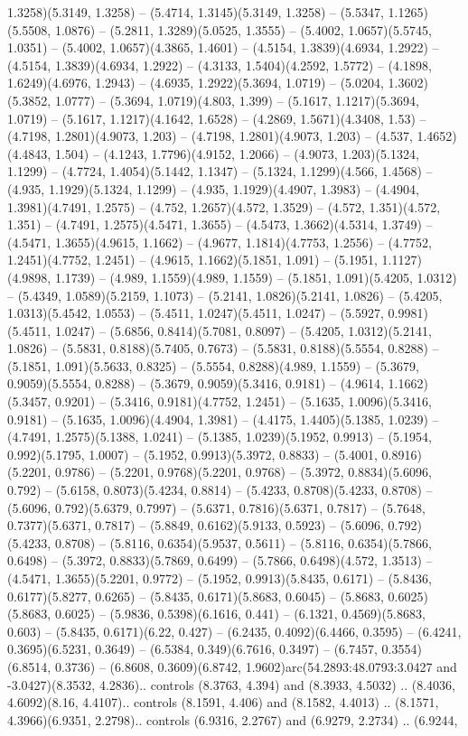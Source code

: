 1.3258)(5.3149, 1.3258) -- (5.4714, 1.3145)(5.3149, 1.3258) -- (5.5347, 1.1265)(5.5508, 1.0876) -- (5.2811, 1.3289)(5.0525, 1.3555) -- (5.4002, 1.0657)(5.5745, 1.0351) -- (5.4002, 1.0657)(4.3865, 1.4601) -- (4.5154, 1.3839)(4.6934, 1.2922) -- (4.5154, 1.3839)(4.6934, 1.2922) -- (4.3133, 1.5404)(4.2592, 1.5772) -- (4.1898, 1.6249)(4.6976, 1.2943) -- (4.6935, 1.2922)(5.3694, 1.0719) -- (5.0204, 1.3602)(5.3852, 1.0777) -- (5.3694, 1.0719)(4.803, 1.399) -- (5.1617, 1.1217)(5.3694, 1.0719) -- (5.1617, 1.1217)(4.1642, 1.6528) -- (4.2869, 1.5671)(4.3408, 1.53) -- (4.7198, 1.2801)(4.9073, 1.203) -- (4.7198, 1.2801)(4.9073, 1.203) -- (4.537, 1.4652)(4.4843, 1.504) -- (4.1243, 1.7796)(4.9152, 1.2066) -- (4.9073, 1.203)(5.1324, 1.1299) -- (4.7724, 1.4054)(5.1442, 1.1347) -- (5.1324, 1.1299)(4.566, 1.4568) -- (4.935, 1.1929)(5.1324, 1.1299) -- (4.935, 1.1929)(4.4907, 1.3983) -- (4.4904, 1.3981)(4.7491, 1.2575) -- (4.752, 1.2657)(4.572, 1.3529) -- (4.572, 1.351)(4.572, 1.351) -- (4.7491, 1.2575)(4.5471, 1.3655) -- (4.5473, 1.3662)(4.5314, 1.3749) -- (4.5471, 1.3655)(4.9615, 1.1662) -- (4.9677, 1.1814)(4.7753, 1.2556) -- (4.7752, 1.2451)(4.7752, 1.2451) -- (4.9615, 1.1662)(5.1851, 1.091) -- (5.1951, 1.1127)(4.9898, 1.1739) -- (4.989, 1.1559)(4.989, 1.1559) -- (5.1851, 1.091)(5.4205, 1.0312) -- (5.4349, 1.0589)(5.2159, 1.1073) -- (5.2141, 1.0826)(5.2141, 1.0826) -- (5.4205, 1.0313)(5.4542, 1.0553) -- (5.4511, 1.0247)(5.4511, 1.0247) -- (5.5927, 0.9981)(5.4511, 1.0247) -- (5.6856, 0.8414)(5.7081, 0.8097) -- (5.4205, 1.0312)(5.2141, 1.0826) -- (5.5831, 0.8188)(5.7405, 0.7673) -- (5.5831, 0.8188)(5.5554, 0.8288) -- (5.1851, 1.091)(5.5633, 0.8325) -- (5.5554, 0.8288)(4.989, 1.1559) -- (5.3679, 0.9059)(5.5554, 0.8288) -- (5.3679, 0.9059)(5.3416, 0.9181) -- (4.9614, 1.1662)(5.3457, 0.9201) -- (5.3416, 0.9181)(4.7752, 1.2451) -- (5.1635, 1.0096)(5.3416, 0.9181) -- (5.1635, 1.0096)(4.4904, 1.3981) -- (4.4175, 1.4405)(5.1385, 1.0239) -- (4.7491, 1.2575)(5.1388, 1.0241) -- (5.1385, 1.0239)(5.1952, 0.9913) -- (5.1954, 0.992)(5.1795, 1.0007) -- (5.1952, 0.9913)(5.3972, 0.8833) -- (5.4001, 0.8916)(5.2201, 0.9786) -- (5.2201, 0.9768)(5.2201, 0.9768) -- (5.3972, 0.8834)(5.6096, 0.792) -- (5.6158, 0.8073)(5.4234, 0.8814) -- (5.4233, 0.8708)(5.4233, 0.8708) -- (5.6096, 0.792)(5.6379, 0.7997) -- (5.6371, 0.7816)(5.6371, 0.7817) -- (5.7648, 0.7377)(5.6371, 0.7817) -- (5.8849, 0.6162)(5.9133, 0.5923) -- (5.6096, 0.792)(5.4233, 0.8708) -- (5.8116, 0.6354)(5.9537, 0.5611) -- (5.8116, 0.6354)(5.7866, 0.6498) -- (5.3972, 0.8833)(5.7869, 0.6499) -- (5.7866, 0.6498)(4.572, 1.3513) -- (4.5471, 1.3655)(5.2201, 0.9772) -- (5.1952, 0.9913)(5.8435, 0.6171) -- (5.8436, 0.6177)(5.8277, 0.6265) -- (5.8435, 0.6171)(5.8683, 0.6045) -- (5.8683, 0.6025)(5.8683, 0.6025) -- (5.9836, 0.5398)(6.1616, 0.441) -- (6.1321, 0.4569)(5.8683, 0.603) -- (5.8435, 0.6171)(6.22, 0.427) -- (6.2435, 0.4092)(6.4466, 0.3595) -- (6.4241, 0.3695)(6.5231, 0.3649) -- (6.5384, 0.349)(6.7616, 0.3497) -- (6.7457, 0.3554)(6.8514, 0.3736) -- (6.8608, 0.3609)(6.8742, 1.9602)arc(54.2893:48.0793:3.0427 and -3.0427)(8.3532, 4.2836).. controls (8.3763, 4.394) and (8.3933, 4.5032) .. (8.4036, 4.6092)(8.16, 4.4107).. controls (8.1591, 4.406) and (8.1582, 4.4013) .. (8.1571, 4.3966)(6.9351, 2.2798).. controls (6.9316, 2.2767) and (6.9279, 2.2734) .. (6.9244, 